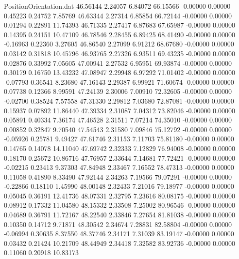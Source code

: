 \begin{filecontents}{PositionOrientation.dat}
  46.56144    2.24057    6.84072    66.15566   -0.00000    0.00000    0.45223    0.24752    7.85769
  46.63344    2.27314    6.85854    66.72144   -0.00000    0.00000    0.01294    0.22891   11.74393
  46.71335    2.27417    6.87683    67.65987   -0.00000    0.00000    0.14395    0.24151   10.47109
  46.78546    2.28455    6.89425    68.41490   -0.00000    0.00000   -0.16963    0.22360    3.27605
  46.86540    2.27099    6.91212    68.67680   -0.00000    0.00000    0.03142    0.31818   10.45796
  46.93765    2.27326    6.93511    69.43235   -0.00000    0.00000    0.02876    0.33992    7.05605
  47.00941    2.27532    6.95951    69.93874   -0.00000    0.00000    0.30179    0.16750   13.43232
  47.08947    2.29948    6.97292    71.01402   -0.00000    0.00000   -0.07793    0.36541    8.23680
  47.16143    2.29387    6.99921    71.60674   -0.00000    0.00000    0.07738    0.12366    8.99591
  47.24139    2.30006    7.00910    72.32605   -0.00000    0.00000   -0.02700    0.38524    7.57558
  47.31330    2.29812    7.03680    72.87081   -0.00000    0.00000    0.15937    0.07892   11.86440
  47.39334    2.31087    7.04312    73.82046   -0.00000    0.00000    0.05891    0.40334    7.36174
  47.46528    2.31511    7.07214    74.35010   -0.00000    0.00000    0.00852    0.32847    9.70540
  47.54543    2.31580    7.09846    75.12792   -0.00000    0.00000   -0.05926    0.25781    9.49427
  47.61746    2.31153    7.11703    75.81180   -0.00000    0.00000    0.14765    0.14078   14.11040
  47.69742    2.32333    7.12829    76.94008   -0.00000    0.00000    0.18170    0.25672   10.86716
  47.76957    2.33644    7.14681    77.72421   -0.00000    0.00000   -0.02215    0.23413    9.37303
  47.84948    2.33467    7.16552    78.47313   -0.00000    0.00000    0.11058    0.41890    8.33490
  47.92144    2.34263    7.19566    79.07291   -0.00000    0.00000   -0.22866    0.18110    1.45990
  48.00148    2.32433    7.21016    79.18977   -0.00000    0.00000    0.05045    0.36191   12.41736
  48.07331    2.32795    7.23616    80.08175   -0.00000    0.00000    0.08912    0.17332   11.04580
  48.15332    2.33508    7.25002    80.96546   -0.00000    0.00000    0.04689    0.36791   11.72167
  48.22540    2.33846    7.27654    81.81038   -0.00000    0.00000    0.10350    0.14712    9.71871
  48.30542    2.34674    7.28831    82.58804   -0.00000    0.00000   -0.06994    0.30635    8.37550
  48.37746    2.34171    7.31039    83.19147   -0.00000    0.00000    0.03432    0.21424   10.21709
  48.44949    2.34418    7.32582    83.92736   -0.00000    0.00000    0.11060    0.20918   10.83173

\end{filecontents}
